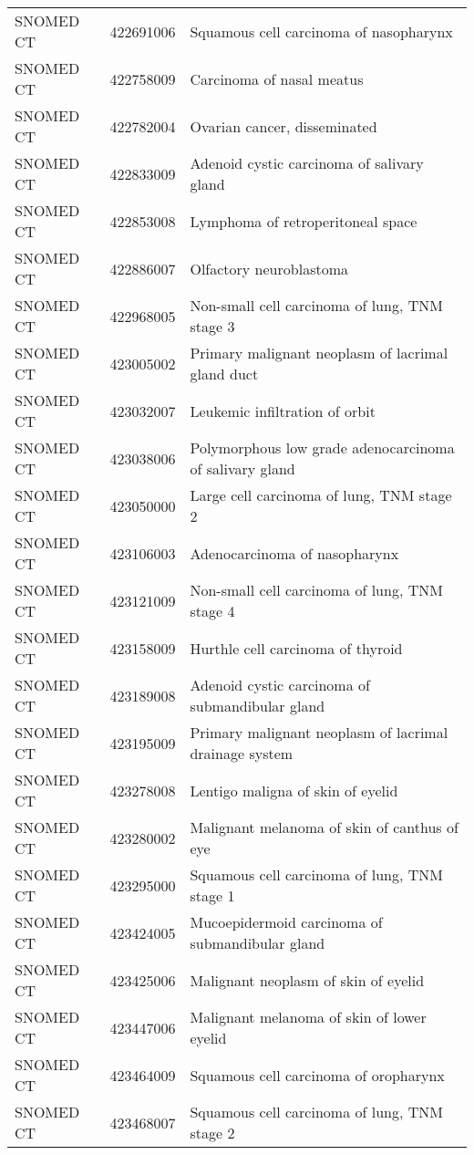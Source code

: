 \begin{longtable}{p{}p{}p{}}
  SNOMED CT & 422691006 & Squamous cell carcinoma of nasopharynx \\ 
  SNOMED CT & 422758009 & Carcinoma of nasal meatus \\ 
  SNOMED CT & 422782004 & Ovarian cancer, disseminated \\ 
  SNOMED CT & 422833009 & Adenoid cystic carcinoma of salivary gland \\ 
  SNOMED CT & 422853008 & Lymphoma of retroperitoneal space \\ 
  SNOMED CT & 422886007 & Olfactory neuroblastoma \\ 
  SNOMED CT & 422968005 & Non-small cell carcinoma of lung, TNM stage 3 \\ 
  SNOMED CT & 423005002 & Primary malignant neoplasm of lacrimal gland duct \\ 
  SNOMED CT & 423032007 & Leukemic infiltration of orbit \\ 
  SNOMED CT & 423038006 & Polymorphous low grade adenocarcinoma of salivary gland \\ 
  SNOMED CT & 423050000 & Large cell carcinoma of lung, TNM stage 2 \\ 
  SNOMED CT & 423106003 & Adenocarcinoma of nasopharynx \\ 
  SNOMED CT & 423121009 & Non-small cell carcinoma of lung, TNM stage 4 \\ 
  SNOMED CT & 423158009 & Hurthle cell carcinoma of thyroid \\ 
  SNOMED CT & 423189008 & Adenoid cystic carcinoma of submandibular gland \\ 
  SNOMED CT & 423195009 & Primary malignant neoplasm of lacrimal drainage system \\ 
  SNOMED CT & 423278008 & Lentigo maligna of skin of eyelid \\ 
  SNOMED CT & 423280002 & Malignant melanoma of skin of canthus of eye \\ 
  SNOMED CT & 423295000 & Squamous cell carcinoma of lung, TNM stage 1 \\ 
  SNOMED CT & 423424005 & Mucoepidermoid carcinoma of submandibular gland \\ 
  SNOMED CT & 423425006 & Malignant neoplasm of skin of eyelid \\ 
  SNOMED CT & 423447006 & Malignant melanoma of skin of lower eyelid \\ 
  SNOMED CT & 423464009 & Squamous cell carcinoma of oropharynx \\ 
  SNOMED CT & 423468007 & Squamous cell carcinoma of lung, TNM stage 2 \\ 

\end{longtable}
